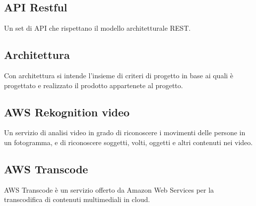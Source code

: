 \subsection*{API Restful}
Un set di API che rispettano il modello architetturale REST.

\subsection*{Architettura}
Con architettura si intende l'insieme di criteri di progetto in base ai quali è progettato e realizzato il prodotto appartenete al progetto.

\subsection*{AWS Rekognition video}
Un servizio di analisi video in grado di riconoscere i movimenti delle persone in un fotogramma, e di riconoscere soggetti, volti, oggetti e altri contenuti nei video.

\subsection*{AWS Transcode}
AWS Transcode è un servizio offerto da Amazon Web Services per la transcodifica di contenuti multimediali in cloud.


